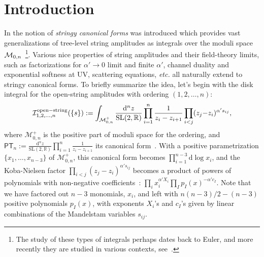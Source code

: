 \documentclass[hidelinks,12pt]{article}
\begin{document}
\vfill \eject



\baselineskip=18pt

\tableofcontents

\newpage

\section{Introduction}
In \cite{Arkani-Hamed:2019mrd} the notion of {\it stringy canonical forms} was introduced which provides vast generalizations of tree-level string amplitudes as integrals over the moduli space ${\cal M}_{0, n}$~\footnote{The study of these types of integrals perhaps dates back to Euler, and more recently they are studied in various contexts, see~\cite{Mellin, Eulermellin, Panzer:2019yxl}. }. Various nice properties of string amplitudes and their field-theory limits, such as factorizations for $\alpha' \to 0$ limit and finite $\alpha'$, channel duality and exponential softness at UV, scattering equations, {\it etc.} all naturally extend to stringy canonical forms. To briefly summarize the idea, let's begin with the disk integral for the open-string amplitudes with ordering $(1,2,\dots, n)$:
\begin{equation}\label{stringint}
{\cal I}^{\rm open-string}_{1,2,\dots,n} (\{s\}):=\int_{\mathcal M_{0,n}^+}
\frac{\mathrm d^{n}z}{\mathrm{SL}(2,\mathbb{R})} \prod_{i=1}^{n}\frac{1}{z_{i}-z_{i{+}1}}
\prod_{i<j}(z_j{-}z_i)^{\alpha' s_{ij}},
\end{equation}
where $\mathcal M_{0,n}^+$ is the positive part of moduli space for the ordering, and $\mathsf{PT}_n:=\frac{\mathrm d^{n}z}{\mathrm{SL}(2,\mathbb{R})} \prod_{i=1}^{n}\frac{1}{z_{i}-z_{i+1}}$ its canonical form~\cite{Arkani-Hamed:2017mur}.  %
With a positive parametrization $\{x_1,\dots,x_{n-3}\}$ of $\mathcal M_{0,n}^+$, 
this canonical form becomes $\prod_{i=1}^{n-3}\mathrm d \log x_i$, and the Koba-Nielsen factor $\prod_{i<j}(z_j-z_i)^{\alpha' s_{i j}}$ becomes a product of powers of polynomials with 
non-negative coefficients~\cite{Arkani-Hamed:2019mrd}: $\prod_i x_i^{\alpha' X_i} \prod_I p_I(x)^{-\alpha' c_I}$. Note that we have factored out $n{-}3$ monomials, $x_i$, and left with $n(n{-}3)/2-(n{-}3)$ positive polynomials $p_I(x)$, with exponents $X_i$'s and $c_I$'s given by linear combinations of the Mandelstam variables $s_{ij}$. 
\end{document}
